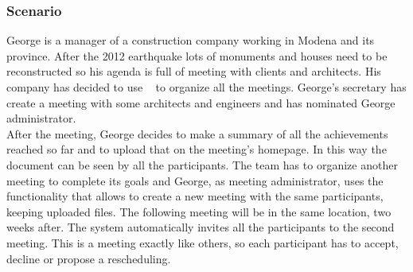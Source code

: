 \subsubsection{Scenario \thecountScenarios }

George is a manager of a construction company working in Modena and its province. After the 2012 earthquake lots of monuments and houses need to be reconstructed so his agenda is full of meeting with clients and architects. His company has decided to use \projectname~ to organize all the meetings. George's secretary has create a meeting with some architects and engineers and has nominated George administrator. \\
After the meeting, George decides to make a summary of all the achievements reached so far and to upload that on the meeting's homepage. In this way the document can be seen by all the participants. The team has to organize another meeting to complete its goals and George, as meeting administrator, uses the \projectname~ functionality that allows to create a new meeting with the same participants, keeping uploaded files. The following meeting will be in the same location, two weeks after. The system automatically invites all the participants to the second meeting. This is a meeting exactly like others, so each participant has to accept, decline or propose a rescheduling.